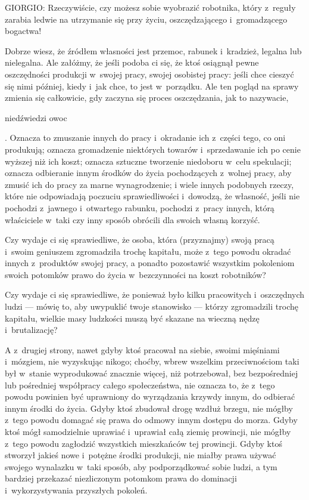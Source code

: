 \documentclass[oneside,polish,11pt,sfheadings]{mwbk}
\begin{document}
 
\noindent GIORGIO: Rzeczywiście, czy możesz sobie wyobrazić robotnika, który z~reguły zarabia ledwie na utrzymanie się przy życiu,
oszczędzającego i~gromadzącego bogactwa! 

 
Dobrze wiesz, że źródłem własności jest przemoc, rabunek i~kradzież, legalna lub nielegalna. Ale załóżmy, że jeśli
podoba ci się, że ktoś osiągnął pewne oszczędności produkcji w~swojej pracy, swojej osobistej pracy: jeśli chce cieszyć
się nimi później, kiedy i~jak chce, to jest w~porządku. Ale ten pogląd na sprawy zmienia się całkowicie, gdy zaczyna
się proces oszczędzania, jak to nazywacie,\begin{itshape}niedźwiedzi owoc \end{itshape}.
Oznacza to zmuszanie innych do pracy i~okradanie ich z~części tego, co oni produkują; oznacza gromadzenie niektórych
towarów i~sprzedawanie ich po cenie wyższej niż ich koszt; oznacza sztuczne tworzenie niedoboru w~celu spekulacji;
oznacza odbieranie innym środków do życia pochodzących z~wolnej pracy, aby zmusić ich do pracy za marne wynagrodzenie;
i wiele innych podobnych rzeczy, które nie odpowiadają poczuciu sprawiedliwości i~dowodzą, że własność, jeśli nie
pochodzi z~jawnego i~otwartego rabunku, pochodzi z~pracy innych, którą właściciele w~taki czy inny sposób obrócili dla
swoich własną korzyść. 

 
Czy wydaje ci się sprawiedliwe, że osoba, która (przyznajmy) swoją pracą i~swoim geniuszem zgromadziła trochę kapitału,
może z~tego powodu okradać innych z~produktów swojej pracy, a ponadto pozostawić wszystkim pokoleniom swoich potomków
prawo do życia w~bezczynności na koszt robotników? 

 
Czy wydaje ci się sprawiedliwe, że ponieważ było kilku pracowitych i~oszczędnych ludzi — mówię to, aby uwypuklić twoje
stanowisko — którzy zgromadzili trochę kapitału, wielkie masy ludzkości muszą być skazane na wieczną nędzę i~brutalizację? 

 
A z~drugiej strony, nawet gdyby ktoś pracował na siebie, swoimi mięśniami i~mózgiem, nie wyzyskując nikogo; choćby,
wbrew wszelkim przeciwnościom taki był w~stanie wyprodukować znacznie więcej, niż potrzebował, bez bezpośredniej lub
pośredniej współpracy całego społeczeństwa, nie oznacza to, że z~tego powodu powinien być uprawniony do wyrządzania
krzywdy innym, do odbierać innym środki do życia. Gdyby ktoś zbudował drogę wzdłuż brzegu, nie mógłby z~tego powodu
domagać się prawa do odmowy innym dostępu do morza. Gdyby ktoś mógł samodzielnie uprawiać i~uprawiał całą ziemię
prowincji, nie mógłby z~tego powodu zagłodzić wszystkich mieszkańców tej prowincji. Gdyby ktoś stworzył jakieś nowe i~potężne środki produkcji, nie miałby prawa używać swojego wynalazku w~taki sposób, aby podporządkować sobie ludzi, a
tym bardziej przekazać niezliczonym potomkom prawa do dominacji i~wykorzystywania przyszłych pokoleń. 
\end{document}
